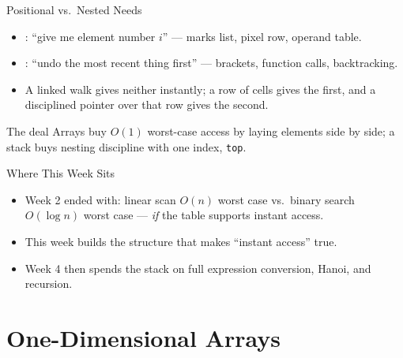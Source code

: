\documentclass[aspectratio=169]{beamer}
\begin{document}
\begin{frame}{Positional vs.\ Nested Needs}
  \begin{itemize}
    \item {}: ``give me element number $i$'' --- marks list,
      pixel row, operand table.
    \item {}: ``undo the most recent thing first'' --- brackets,
      function calls, backtracking.
    \item A linked walk gives neither instantly; a row of cells gives the
      first, and a disciplined pointer over that row gives the second.
  \end{itemize}
  \begin{exampleblock}{The deal}
    Arrays buy $O(1)$ worst-case access by laying elements side by side; a
    stack buys nesting discipline with one index, \texttt{top}.
  \end{exampleblock}
\end{frame}

\begin{frame}{Where This Week Sits}
  \begin{itemize}
    \item Week 2 ended with: linear scan $O(n)$ worst case vs.\ binary search
      $O(\log n)$ worst case --- \emph{if} the table supports instant access.
    \item This week builds the structure that makes ``instant access'' true.
    \item Week 4 then spends the stack on full expression conversion, Hanoi,
      and recursion.
  \end{itemize}
\end{frame}


\section{One-Dimensional Arrays}

\end{document}
